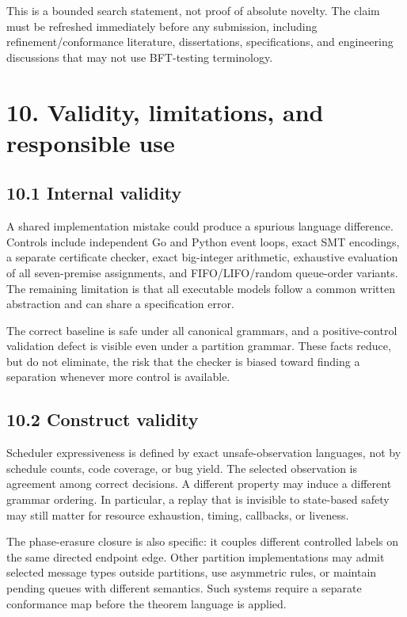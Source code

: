 \documentclass[10pt,a4paper]{article}
\begin{document}
This is a bounded search statement, not proof of absolute novelty. The
claim must be refreshed immediately before any submission, including
refinement/conformance literature, dissertations, specifications, and
engineering discussions that may not use BFT-testing terminology.

\section{10. Validity, limitations, and responsible
use}\label{validity-limitations-and-responsible-use}

\subsection{10.1 Internal validity}\label{internal-validity}

A shared implementation mistake could produce a spurious language
difference. Controls include independent Go and Python event loops,
exact SMT encodings, a separate certificate checker, exact big-integer
arithmetic, exhaustive evaluation of all seven-premise assignments, and
FIFO/LIFO/random queue-order variants. The remaining limitation is that
all executable models follow a common written abstraction and can share
a specification error.

The correct baseline is safe under all canonical grammars, and a
positive-control validation defect is visible even under a partition
grammar. These facts reduce, but do not eliminate, the risk that the
checker is biased toward finding a separation whenever more control is
available.

\subsection{10.2 Construct validity}\label{construct-validity}

Scheduler expressiveness is defined by exact unsafe-observation
languages, not by schedule counts, code coverage, or bug yield. The
selected observation is agreement among correct decisions. A different
property may induce a different grammar ordering. In particular, a
replay that is invisible to state-based safety may still matter for
resource exhaustion, timing, callbacks, or liveness.

The phase-erasure closure is also specific: it couples different
controlled labels on the same directed endpoint edge. Other partition
implementations may admit selected message types outside partitions, use
asymmetric rules, or maintain pending queues with different semantics.
Such systems require a separate conformance map before the theorem
language is applied.
\end{document}
